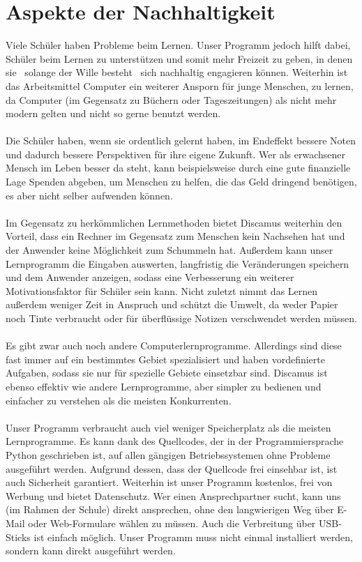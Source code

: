 \documentclass[a4paper, 11pt, titlepage]{article}
\begin{document}
\section{Aspekte der Nachhaltigkeit}
Viele Schüler haben Probleme beim Lernen. Unser Programm jedoch hilft dabei, Schüler beim Lernen zu unterstützen und somit mehr Freizeit zu geben, in denen sie \textendash\ solange der Wille besteht \textendash\ sich nachhaltig engagieren können. Weiterhin ist das Arbeitsmittel Computer ein weiterer Ansporn für junge Menschen, zu lernen, da Computer (im Gegensatz zu Büchern oder Tageszeitungen) als nicht mehr modern gelten und nicht so gerne benutzt werden.\\\\
Die Schüler haben, wenn sie ordentlich gelernt haben, im Endeffekt bessere Noten und dadurch bessere Perspektiven für ihre eigene Zukunft. Wer als erwachsener Mensch im Leben besser da steht, kann beispielsweise durch eine gute finanzielle Lage Spenden abgeben, um Menschen zu helfen, die das Geld dringend benötigen, es aber nicht selber aufwenden können.\\\\
Im Gegensatz zu herkömmlichen Lernmethoden bietet Discamus weiterhin den Vorteil, dass ein Rechner im Gegensatz zum Menschen kein Nachsehen hat und der Anwender keine Möglichkeit zum Schummeln hat. Außerdem kann unser Lernprogramm die Eingaben auswerten, langfristig die Veränderungen speichern und dem Anwender anzeigen, sodass eine Verbesserung ein weiterer Motivationsfaktor für Schüler sein kann. Nicht zuletzt nimmt das Lernen außerdem weniger Zeit in Anspruch und schützt die Umwelt, da weder Papier noch Tinte verbraucht oder für überflüssige Notizen verschwendet werden müssen.\\\\
Es gibt zwar auch noch andere Computerlernprogramme. Allerdings sind diese fast immer auf ein bestimmtes Gebiet spezialisiert und haben vordefinierte Aufgaben, sodass sie nur für spezielle Gebiete einsetzbar sind. Discamus ist ebenso effektiv wie andere Lernprogramme, aber simpler zu bedienen und einfacher zu verstehen als die meisten Konkurrenten.\\\\
Unser Programm verbraucht auch viel weniger Speicherplatz als die meisten Lernprogramme. Es kann dank des Quellcodes, der in der Programmiersprache Python geschrieben ist, auf allen gängigen Betriebssystemen ohne Probleme ausgeführt werden. Aufgrund dessen, dass der Quellcode frei einsehbar ist, ist auch Sicherheit garantiert. Weiterhin ist unser Programm kostenlos, frei von Werbung und bietet Datenschutz. Wer einen Ansprechpartner sucht, kann uns (im Rahmen der Schule) direkt ansprechen, ohne den langwierigen Weg über E-Mail oder Web-Formulare wählen zu müssen. Auch die Verbreitung über USB-Sticks ist einfach möglich. Unser Programm muss nicht einmal installiert werden, sondern kann direkt ausgeführt werden.
\end{document}
